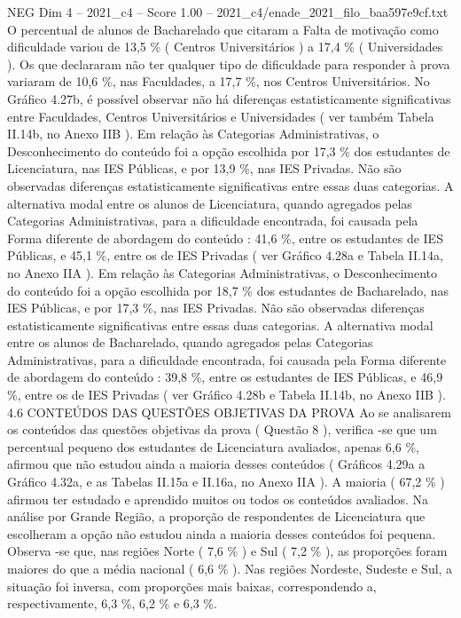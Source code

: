 \begin{textsample}{NEG Dim 4 – 2021\_c4 – Score 1.00 – 2021\_c4/enade\_2021\_filo\_baa597e9cf.txt}
O percentual de alunos de Bacharelado que citaram a Falta de motivação como dificuldade variou de 13,5 \% ( Centros Universitários ) a 17,4 \% ( Universidades ).
Os que declararam não ter qualquer tipo de dificuldade para responder à prova variaram de 10,6 \%, nas Faculdades, a 17,7 \%, nos Centros Universitários.
No Gráfico 4.27b, é possível observar não há diferenças estatisticamente significativas entre Faculdades, Centros Universitários e Universidades ( ver também Tabela II.14b, no Anexo IIB ).
Em relação às Categorias Administrativas, o Desconhecimento do conteúdo foi a opção escolhida por 17,3 \% dos estudantes de Licenciatura, nas IES Públicas, e por 13,9 \%, nas IES Privadas.
Não são observadas diferenças estatisticamente significativas entre essas duas categorias.
A alternativa modal entre os alunos de Licenciatura, quando agregados pelas Categorias Administrativas, para a dificuldade encontrada, foi causada pela Forma diferente de abordagem do conteúdo : 41,6 \%, entre os estudantes de IES Públicas, e 45,1 \%, entre os de IES Privadas ( ver Gráfico 4.28a e Tabela II.14a, no Anexo IIA ).
Em relação às Categorias Administrativas, o Desconhecimento do conteúdo foi a opção escolhida por 18,7 \% dos estudantes de Bacharelado, nas IES Públicas, e por 17,3 \%, nas IES Privadas.
Não são observadas diferenças estatisticamente significativas entre essas duas categorias.
A alternativa modal entre os alunos de Bacharelado, quando agregados pelas Categorias Administrativas, para a dificuldade encontrada, foi causada pela Forma diferente de abordagem do conteúdo : 39,8 \%, entre os estudantes de IES Públicas, e 46,9 \%, entre os de IES Privadas ( ver Gráfico 4.28b e Tabela II.14b, no Anexo IIB ). 4.6 CONTEÚDOS DAS QUESTÕES OBJETIVAS DA PROVA Ao se analisarem os conteúdos das questões objetivas da prova ( Questão 8 ), verifica -se que um percentual pequeno dos estudantes de Licenciatura avaliados, apenas 6,6 \%, afirmou que não estudou ainda a maioria desses conteúdos ( Gráficos 4.29a a Gráfico 4.32a, e as Tabelas II.15a e II.16a, no Anexo IIA ).
A maioria ( 67,2 \% ) afirmou ter estudado e aprendido muitos ou todos os conteúdos avaliados.
Na análise por Grande Região, a proporção de respondentes de Licenciatura que escolheram a opção não estudou ainda a maioria desses conteúdos foi pequena.
Observa -se que, nas regiões Norte ( 7,6 \% ) e Sul ( 7,2 \% ), as proporções foram maiores do que a média nacional ( 6,6 \% ).
Nas regiões Nordeste, Sudeste e Sul, a situação foi inversa, com proporções mais baixas, correspondendo a, respectivamente, 6,3 \%, 6,2 \% e 6,3 \%.

\end{textsample}
